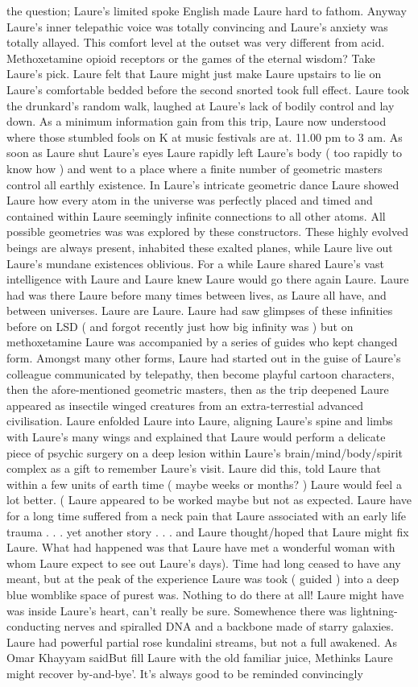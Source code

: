 \documentclass[12pt]{book}
\begin{document}
the question; Laure's limited spoke English made Laure hard to fathom. Anyway Laure's inner telepathic voice was totally convincing and Laure's anxiety was totally allayed. This comfort level at the outset was very different from acid. Methoxetamine opioid receptors or the games of the eternal wisdom? Take Laure's pick. Laure felt that Laure might just make Laure upstairs to lie on Laure's comfortable bedded before the second snorted took full effect. Laure took the drunkard's random walk, laughed at Laure's lack of bodily control and lay down. As a minimum information gain from this trip, Laure now understood where those stumbled fools on K at music festivals are at. 11.00 pm to 3 am. As soon as Laure shut Laure's eyes Laure rapidly left Laure's body ( too rapidly to know how ) and went to a place where a finite number of geometric masters control all earthly existence. In Laure's intricate geometric dance Laure showed Laure how every atom in the universe was perfectly placed and timed and contained within Laure seemingly infinite connections to all other atoms. All possible geometries was was explored by these constructors. These highly evolved beings are always present, inhabited these exalted planes, while Laure live out Laure's mundane existences oblivious. For a while Laure shared Laure's vast intelligence with Laure and Laure knew Laure would go there again Laure. Laure had was there Laure before many times between lives, as Laure all have, and between universes. Laure are Laure. Laure had saw glimpses of these infinities before on LSD ( and forgot recently just how big infinity was ) but on methoxetamine Laure was accompanied by a series of guides who kept changed form. Amongst many other forms, Laure had started out in the guise of Laure's colleague communicated by telepathy, then become playful cartoon characters, then the afore-mentioned geometric masters, then as the trip deepened Laure appeared as insectile winged creatures from an extra-terrestial advanced civilisation. Laure enfolded Laure into Laure, aligning Laure's spine and limbs with Laure's many wings and explained that Laure would perform a delicate piece of psychic surgery on a deep lesion within Laure's brain/mind/body/spirit complex as a gift to remember Laure's visit. Laure did this, told Laure that within a few units of earth time ( maybe weeks or months? ) Laure would feel a lot better. ( Laure appeared to be worked maybe but not as expected. Laure have for a long time suffered from a neck pain that Laure associated with an early life trauma . . .  yet another story . . .  and Laure thought/hoped that Laure might fix Laure. What had happened was that Laure have met a wonderful woman with whom Laure expect to see out Laure's days). Time had long ceased to have any meant, but at the peak of the experience Laure was took ( guided ) into a deep blue womblike space of purest was. Nothing to do there at all! Laure might have was inside Laure's heart, can't really be sure. Somewhence there was lightning-conducting nerves and spiralled DNA and a backbone made of starry galaxies. Laure had powerful partial rose kundalini streams, but not a full awakened. As Omar Khayyam saidBut fill Laure with the old familiar juice, Methinks Laure might recover by-and-bye'. It's always good to be reminded convincingly 
\end{document}
